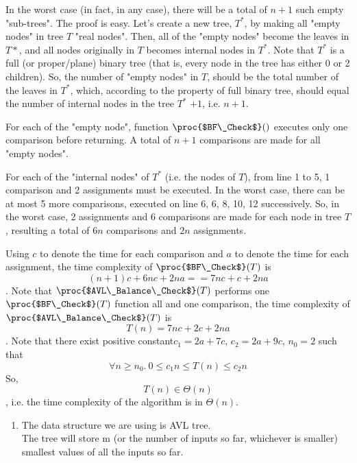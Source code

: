 \documentclass[11pt, answers]{exam}
\theoremstyle{plain}
\theoremstyle{definition}
\begin{document}
\begin{questions}
\begin{solution}
In the worst case (in fact, in any case), there will be a total of $n+1$ such empty "sub-trees". The proof is easy. Let's create a new tree, $T^*$, by making all "empty nodes" in tree $T$ "real nodes". Then, all of the "empty nodes" become the leaves in $T*$, and all nodes originally in $T$ becomes internal nodes in $T^*$. Note that $T^*$ is a full (or proper/plane) binary tree (that is, every node in the tree has either 0 or 2 children). So, the number of "empty nodes" in $T$, should be the total number of the leaves in $T^*$, which, according to the property of full binary tree, should equal the number of internal nodes in the tree $T^*$ $+1$, i.e. $n+1$.

For each of the "empty node", function $\proc{$BF\_Check$}()$ executes only one comparison before returning. A total of $n+1$ comparisons are made for all "empty nodes".

For each of the "internal nodes" of $T^*$ (i.e. the nodes of $T$), from line 1 to 5, 1 comparison and 2 assignments must be executed. In the worst case, there can be at most 5 more comparisons, executed on line 6, 6, 8, 10, 12 successively. So, in the worst case, 2 assignments and 6 comparisons are made for each node in tree $T$, resulting a total of $6n$ comparisons and $2n$ assignments.

Using $c$ to denote the time for each comparison and $a$ to denote the time for each assignment, the time complexity of $\proc{$BF\_Check$}(T)$ is $$(n+1)c+6nc+2na == 7nc+c+2na$$. Note that $\proc{$AVL\_Balance\_Check$}(T)$ performs one $\proc{$BF\_Check$}(T)$ function all and one comparison, the time complexity of $\proc{$AVL\_Balance\_Check$}(T)$ is $$T(n) = 7nc+2c+2na$$.
Note that there exist positive constant$c_1=2a+7c$, $c_2=2a+9c$, $n_0=2$ such that $$\forall n\geq n_0 .\  0\leq c_1n \leq T(n) \leq c_2n$$
So, $$T(n) \in \Theta(n)$$, i.e. the time complexity of the algorithm is in $\Theta(n)$.
\end{solution}

\question
\begin{solution}
\begin{enumerate}
\item The data structure we are using is AVL tree. \\
The tree will store m (or the number of inputs so far, whichever is smaller) smallest values of all the inputs so far.


\end{enumerate}
\end{solution}
\end{questions}
\end{document}
